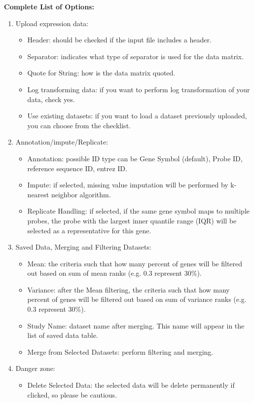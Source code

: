 \textbf{Complete List of Options:} 
\begin{enumerate}
\item Upload expression data:
\begin{itemize}
\item Header: should be checked if the input file includes a header.
\item Separator: indicates what type of separator is used for the data matrix.
\item Quote for String: how is the data matrix quoted.
\item Log transforming data: if you want to perform log transformation of your data, check yes.
\item Use existing datasets: if you want to load a dataset previously uploaded, you can choose from the checklist.
\end{itemize}
\item Annotation/impute/Replicate:
\begin{itemize}
\item Annotation: possible ID type can be Gene Symbol (default), Probe ID, reference sequence ID, entrez ID.
\item Impute: if selected, missing value imputation will be performed by k-nearest neighbor algorithm.
\item Replicate Handling: if selected, if the same gene symbol maps to multiple probes, the probe with the largest inner quantile range (IQR) will be selected
as a representative for this gene.
\end{itemize}
\item Saved Data, Merging and Filtering Datasets:
\begin{itemize}
\item Mean: the criteria such that how many percent of genes will be filtered out based on sum of mean ranks (e.g. 0.3 represent 30\%).
\item Variance: after the Mean filtering, the criteria such that how many percent of genes will be filtered out based on sum of variance ranks (e.g. 0.3 represent 30\%).
\item Study Name: dataset name after merging. This name will appear in the list of saved data table.
\item Merge from Selected Datasets: perform filtering and merging.
\end{itemize}
\item Danger zone:
\begin{itemize}
\item Delete Selected Data: the selected data will be delete permanently if clicked, so please be cautious.
\end{itemize}

\end{enumerate}



